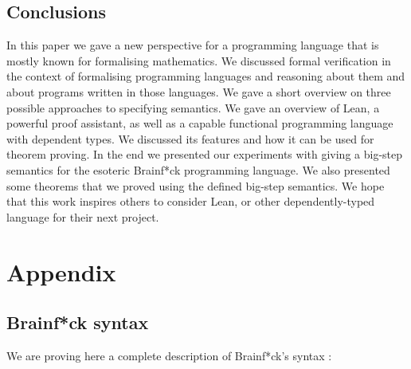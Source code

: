\documentclass[runningheads]{llncs}
\begin{document}
\section{Conclusions}

In this paper we gave a new perspective for a programming language that is
mostly known for formalising mathematics. We discussed formal verification in
the context of formalising programming languages and reasoning about them and
about programs written in those languages. We gave a short overview on three
possible approaches to specifying semantics. We gave an overview of Lean, a
powerful proof assistant, as well as a capable functional programming language
with dependent types. We discussed its features and how it can be used for
theorem proving. In the end we presented our experiments with giving a big-step
semantics for the esoteric Brainf*ck programming language. We also presented
some theorems that we proved using the defined big-step semantics. We hope
that this work inspires others to consider Lean, or other dependently-typed
language for their next project.

%

\newpage



\clearpage
\appendix
\chapter*{Appendix}

\section{Brainf*ck syntax}
\label{ap:syntax}

We are proving here a complete description of Brainf*ck's syntax \cite{bf}:
\end{document}
